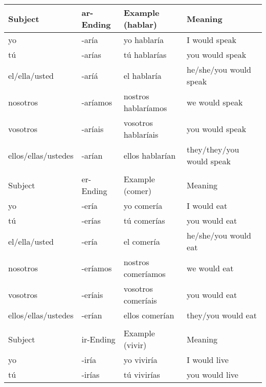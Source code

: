 \documentclass[a4paper,12pt]{article}
\begin{document}
\begin{itemize}
  \begin{table}[H]
    \centering
    \begin{tabular}{llll}
      Subject             & ar-Ending & Example (hablar)    & Meaning                    \\
      \toprule
      yo                  & -aría     & yo hablaría         & I would speak              \\
      tú                  & -arías    & tú hablarías        & you would speak \\
      el/ella/usted       & -aríá     & el hablaría         & he/she/you would speak     \\
      nosotros            & -aríamos  & nostros hablaríamos & we would speak             \\
      vosotros            & -aríais   & vosotros hablaríais & you would speak \\
      ellos/ellas/ustedes & -arían    & ellos hablarían     & they/they/you would speak  \\
      \midrule
                          &           &                     &                            \\
      Subject             & er-Ending & Example (comer)     & Meaning                    \\
      \toprule
      yo                  & -ería     & yo comería          & I would eat                \\
      tú                  & -erías    & tú comerías         & you would eat              \\
      el/ella/usted       & -ería     & el comería          & he/she/you would eat       \\
      nosotros            & -eríamos  & nostros comeríamos  & we would eat               \\
      vosotros            & -eríais   & vosotros comeríais  & you would eat              \\
      ellos/ellas/ustedes & -erían    & ellos comerían      & they/you would eat         \\
      \midrule
                          &           &                     &                            \\
      Subject             & ir-Ending & Example (vivir)     & Meaning                    \\
      \toprule
      yo                  & -iría     & yo viviría          & I would live               \\
      tú                  & -irías    & tú vivirías         & you would live             \\

\end{tabular}
\end{table}
\end{itemize}
\end{document}
